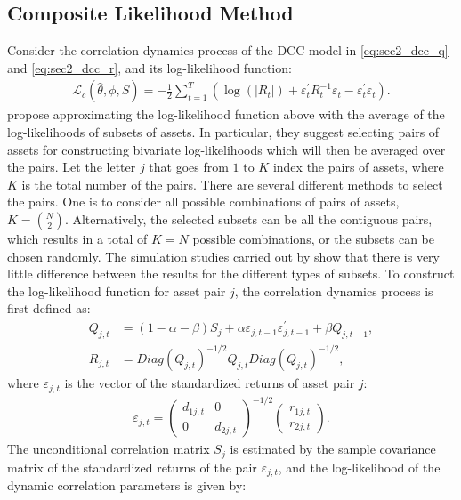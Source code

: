 \subsection{Composite Likelihood Method}
Consider the correlation dynamics process of the DCC model in \eqref{eq:sec2_dcc_q} and \eqref{eq:sec2_dcc_r}, and its log-likelihood function:
\begin{align}
	\mathcal{L}_c(\widehat{\theta},\phi,\widehat{S}) = -\frac{1}{2} \sum_{t=1}^T \left( \operatorname{log} \left( |R_t| \right) + \varepsilon_t^\prime R_t^{-1}\varepsilon_t - \varepsilon_t^\prime \varepsilon_t \right).
\end{align}
\textcite{PAKELETAL} propose approximating the log-likelihood function above with the average of the log-likelihoods of subsets of assets. In particular, they suggest selecting pairs of assets for constructing bivariate log-likelihoods which will then be averaged over the pairs. Let the letter $j$ that goes from $1$ to $K$ index the pairs of assets, where $K$ is the total number of the pairs. There are several different methods to select the pairs. One is to consider all possible combinations of pairs of assets, $K = \binom{N}{2}$. Alternatively, the selected subsets can be all the contiguous pairs, which results in a total of $K=N$ possible combinations, or the subsets can be chosen randomly. The simulation studies carried out by \textcite{PAKELETAL} show that there is very little difference between the results for the different types of subsets. To construct the log-likelihood function for asset pair $j$, the correlation dynamics process is first defined as:
\begin{align}
	Q_{j,t} &= (1-\alpha-\beta)S_{j} + \alpha \varepsilon_{j,t-1} \varepsilon_{j,t-1}^\prime + \beta Q_{j,t-1}, \\
	R_{j,t} &= Diag(Q_{j,t})^{-1/2}Q_{j,t}Diag(Q_{j,t})^{-1/2},
\end{align}
where $\varepsilon_{j,t}$ is the vector of the standardized returns of asset pair $j$:
\begin{align}
	\varepsilon_{j,t} = \begin{pmatrix}
		d_{1j,t} & 0 \\ 0 & d_{2j,t}
	\end{pmatrix}^{-1/2} \begin{pmatrix}
		r_{1j,t} \\ r_{2j,t}
	\end{pmatrix}.
\end{align}
The unconditional correlation matrix $S_{j}$ is estimated by the sample covariance matrix of the standardized returns of the pair $\varepsilon_{j,t}$, and the log-likelihood of the dynamic correlation parameters is given by:
